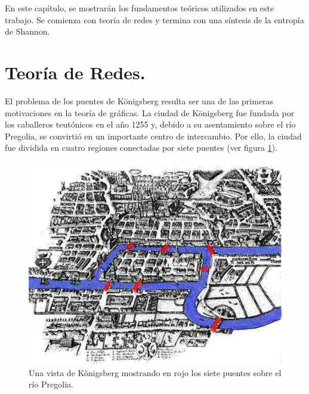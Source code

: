 \documentclass[../main.tex]{subfiles}
\begin{document}
\onehalfspacing



En este capítulo, se mostrarán los fundamentos teóricos utilizados en este trabajo. Se comienza con teoría de redes y termina con una síntesis de la entropía de Shannon. 

\section{Teoría de Redes.}



El problema de los puentes de Königsberg resulta ser una de las primeras motivaciones en la teoría de gráficas. La  ciudad de Königsberg fue fundada por los caballeros teutónicos en el año 1255 y, debido a su asentamiento sobre el río Pregolia, se convirtió en un importante centro de intercambio. Por ello, la ciudad fue dividida en cuatro regiones conectadas por siete puentes (ver figura \ref{fig:marcoteorico_konigsberg}).



\begin{figure}[h!]
    \centering
    \includegraphics[scale = 0.5]{images/marcoteorico_konigsberg.jpg}
    \caption{Una vista de Königsberg mostrando en rojo los siete puentes sobre el río Pregolia.  }
    \label{fig:marcoteorico_konigsberg}
\end{figure}
\end{document}
